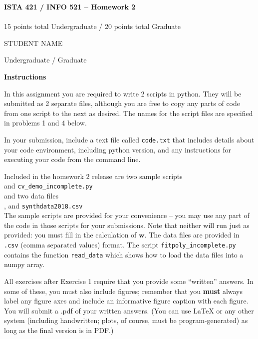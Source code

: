 \documentclass[10pt]{article}
\newcommand{\latex}{\LaTeX\xspace}
\begin{document}
\begin{center}
    {\Large {\bf ISTA 421 / INFO 521 -- Homework 2}} \\
     \\
    15 points total Undergraduate / 20 points total Graduate

\end{center}

\begin{flushright}
STUDENT NAME %

Undergraduate / Graduate %
\end{flushright}


\vspace{1cm}
{\Large {\bf Instructions}}

In this assignment you are required to write 2 scripts in python.  They will be submitted as 2 separate files, although you are free to copy any parts of code from one script to the next as desired.  The names for the script files are specified in problems 1 and 4 below.

In your submission, include a text file called {\tt code.txt} that includes details about your code environment, including python version, and any instructions for executing your code from the command line.

Included in the homework 2 release are two sample scripts \\ 
\-\hspace{2cm}{\tt fitpoly\_incomplete.py} and {\tt cv\_demo\_incomplete.py} \\
and two data files\\
\-\hspace{2cm}{\tt womens100.csv}, and {\tt synthdata2018.csv}\\
The sample scripts are provided for your convenience -- you may use any part of the code in those scripts for your submissions.  Note that neither will run just as provided: you must fill in the calculation of $\mathbf{w}$.  The data files are provided in {\tt .csv} (comma separated values) format.  The script {\tt fitpoly\_incomplete.py} contains the function {\tt read\_data} which shows how to load the data files into a numpy array.

All exercises after Exercise 1 require that you provide some ``written'' answers.  In some of these, you must also include figures; remember that you {\bf must} always label any figure axes and include an informative figure caption with each figure.  You will submit a .pdf of your written answers.  (You can use \latex or any other system (including handwritten; plots, of course, must be program-generated) as long as the final version is in PDF.)
\end{document}
